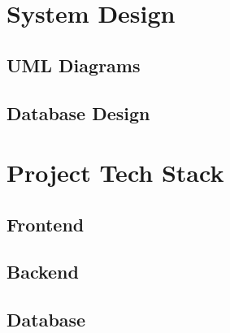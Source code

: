 \section{System Design}

\subsection{UML Diagrams}

\subsection{Database Design}

\section{Project Tech Stack}

\subsection{Frontend}

\subsection{Backend}

\subsection{Database}
